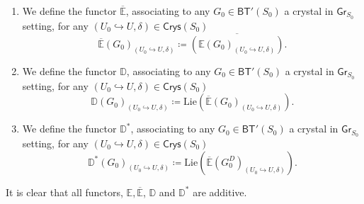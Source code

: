 \begin{defn}[]\leavevmode\vspace{-.2\baselineskip}
\begin{enumerate}
\item We define the functor $\overline{\mathbb{E}}$, associating to
	any $G_0 \in \mathsf{BT}'(S_0)$ a crystal in $\mathsf{Gr}_{S_0}$
	setting, for any $\left(U_0 \hookrightarrow U, \delta\right) \in \mathsf{Crys}(S_0)$
	\begin{equation*}
		\overline{\mathbb{E}}(G_0)_{\left(U_0 \hookrightarrow U, \delta\right)} \coloneqq
		\overline{\left( \mathbb{E}(G_0)_{\left(U_0 \hookrightarrow U, \delta\right)} \right)}
	.\end{equation*}

\item We define the functor $\mathbb{D}$, associating to
	any $G_0 \in \mathsf{BT}'(S_0)$ a crystal in $\mathsf{Gr}_{S_0}$
	setting, for any $\left(U_0 \hookrightarrow U, \delta\right) \in \mathsf{Crys}(S_0)$
	\begin{equation*}
		\mathbb{D}(G_0)_{\left(U_0 \hookrightarrow U, \delta\right)} \coloneqq
		\mathrm{Lie}
		\left( \overline{\mathbb{E}}(G_0)_{\left(U_0 \hookrightarrow U, \delta\right)} \right)
	.\end{equation*}

\item We define the functor $\mathbb{D}^*$, associating to
	any $G_0 \in \mathsf{BT}'(S_0)$ a crystal in $\mathsf{Gr}_{S_0}$
	setting, for any $\left(U_0 \hookrightarrow U, \delta\right) \in \mathsf{Crys}(S_0)$
	\begin{equation*}
		\mathbb{D}^*(G_0)_{\left(U_0 \hookrightarrow U, \delta\right)} \coloneqq
		\mathrm{Lie}
		\left( \overline{\mathbb{E}}(G_0^D)_{\left(U_0 \hookrightarrow U, \delta\right)} \right)
	.\end{equation*}
\end{enumerate}
\end{defn}


\begin{rem}[]
	It is clear that all functors, $\mathbb{E}, \overline{\mathbb{E}}$,
	$\mathbb{D}$ and $\mathbb{D}^*$ are additive.
\end{rem}


